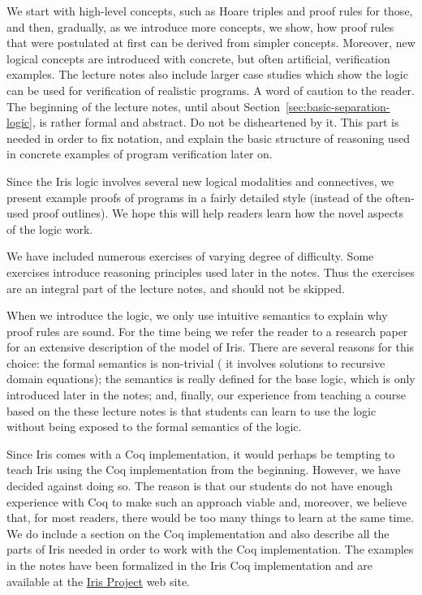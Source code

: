 We start with high-level concepts, such as Hoare triples and proof rules for those, and then, gradually, as we introduce more concepts, we show, \eg{} how proof rules that were postulated at first can be derived from simpler concepts.
Moreover, new logical concepts are introduced with concrete, but often artificial, verification examples.
The lecture notes also include larger case studies which show the logic can be used for verification of realistic programs.
A word of caution to the reader.
The beginning of the lecture notes, until about Section~\ref{sec:basic-separation-logic}, is rather formal and abstract.
Do not be disheartened by it.
This part is needed in order to fix notation, and explain the basic structure of reasoning used in concrete examples of program verification later on.

Since the Iris logic involves several new logical modalities and connectives, we present example
proofs of programs in a fairly detailed style (instead of the often-used proof outlines). We hope
this will help readers learn how the novel aspects of the logic work.

We have included numerous exercises of varying degree of difficulty.
Some exercises introduce reasoning principles used later in the notes.
Thus the exercises are an integral part of the lecture notes, and should not be skipped.

When we introduce the logic, we only use intuitive semantics to explain why 
proof rules are sound.
For the time being we refer the reader to a research paper~\cite{iris-ground-up} for an extensive description of the model of Iris.
There are several reasons for this choice:
the formal semantics is non-trivial (\eg{} it involves solutions to recursive domain equations); 
the semantics is really defined for the base logic, which is only introduced later in the notes;
and, finally, our experience from teaching a course based on the these lecture notes is that 
students can learn to use the logic without being exposed to the formal semantics of the logic.

Since Iris comes with a Coq implementation, it would perhaps be tempting to teach Iris
using the Coq implementation from the beginning. However, we have decided against
doing so. The reason is that our students do not have enough experience with Coq 
to make such an approach viable and, moreover, we believe that, for most readers, there 
would be too many things to learn at the same time.  We do include a section on 
the Coq implementation and also describe all the parts of Iris needed in order
to work with the Coq implementation.  The examples in the notes have been formalized 
in the Iris Coq implementation and are available at the \href{http://iris-project.org}{Iris Project} web site.

